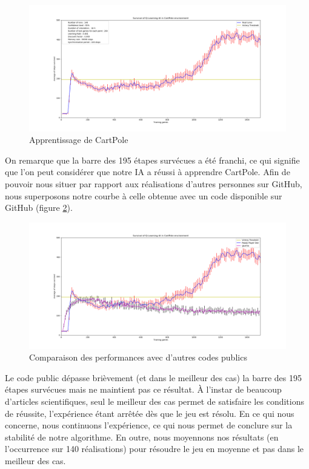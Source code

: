 \begin{figure}[h]
 \centering
 \includegraphics[width  = \textwidth]{img/cartpole_2reseaux.png}
 \caption{Apprentissage de CartPole}
 \label{fig:cartpole-2reseaux}
\end{figure}


On remarque que la barre des 195 étapes survécues a été franchi, ce qui signifie que l'on peut considérer que notre IA a réussi à apprendre CartPole.
Afin de pouvoir nous situer par rapport aux réalisations d'autres personnes sur GitHub, nous superposons notre courbe à celle obtenue avec un code disponible
sur GitHub (figure \ref{fig:gsurma}).

\begin{figure}[ht]
 \centering
 \includegraphics[width  = \textwidth]{img/gsurma.png}
 \caption{Comparaison des performances avec d'autres codes publics}
 \label{fig:gsurma}
\end{figure}

Le code public dépasse brièvement (et dans le meilleur des cas) la barre des 195 étapes survécues mais ne maintient pas ce résultat.
À l'instar de beaucoup d'articles scientifiques, seul le meilleur des cas permet de satisfaire les conditions de réussite, l'expérience étant arrêtée dès
que le jeu est résolu. En ce qui nous concerne, nous continuons l'expérience, ce qui nous permet de conclure sur la stabilité de notre algorithme. En outre,
nous moyennons nos résultats (en l'occurrence sur 140 réalisations) pour résoudre le jeu en moyenne et pas dans le meilleur des cas.

